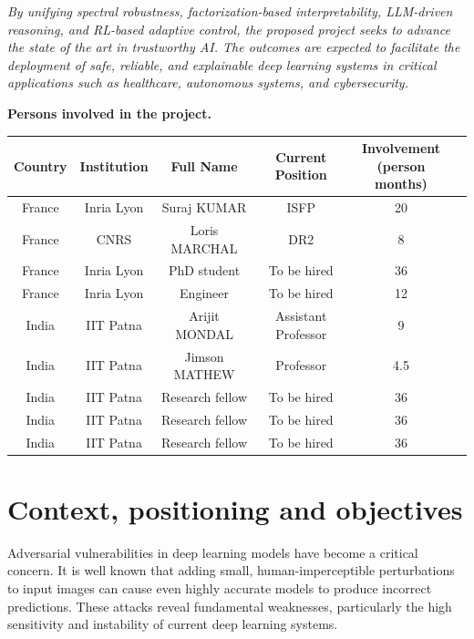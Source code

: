 \documentclass[a4paper,11pt]{article}
\begin{document}
	\emph{By unifying spectral robustness, factorization-based interpretability, LLM-driven reasoning, and RL-based adaptive control, the proposed project seeks to advance the state of the art in trustworthy AI. The outcomes are expected to facilitate the deployment of safe, reliable, and explainable deep learning systems in critical applications such as healthcare, autonomous systems, and cybersecurity.
	}
\vfill
\begin{center}
	\textbf{Persons involved in the project.}
	\begin{tabular}{|c|c|c|c|c|c|}
		\hline
		\textbf{Country} & \textbf{Institution} & \textbf{Full Name} & \textbf{Current Position} & \makecell{\bf Involvement\\ (person months)} \\
		\hline
		France & Inria Lyon & Suraj KUMAR   & ISFP  & 20\\ \hline
		France & CNRS & Loris MARCHAL & DR2  & 8\\ \hline
		France & Inria Lyon & PhD student & To be hired  & 36\\ \hline
		France & Inria Lyon & Engineer & To be hired & 12\\ \hline
		\hline
		India & IIT Patna & Arijit MONDAL  & Assistant Professor & 9\\ \hline
		India & IIT Patna & Jimson MATHEW & Professor & 4.5\\ \hline
		India & IIT Patna & Research fellow & To be hired & 36\\ \hline
		India & IIT Patna & Research fellow & To be hired & 36\\ \hline
		India & IIT Patna & Research fellow & To be hired & 36\\ \hline
	\end{tabular}
	
\end{center}
\vfill
\newpage

\section{Context, positioning and objectives}

Adversarial vulnerabilities in deep learning models have become a critical concern. It is well known that adding small, human-imperceptible perturbations to input images can cause even highly accurate models to produce incorrect predictions. These attacks reveal fundamental weaknesses, particularly the high sensitivity and instability of current deep learning systems.
\end{document}
